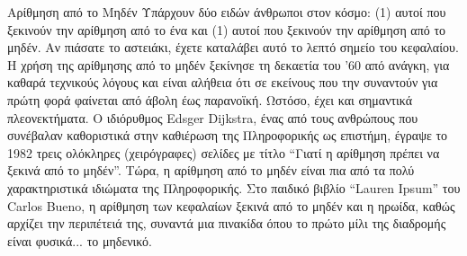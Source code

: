 \documentclass[a4paper,11pt,oneside]{book}
\begin{document}
\begin{theory}{Αρίθμηση από το Μηδέν}
Υπάρχουν δύο ειδών άνθρωποι στον κόσμο: (1) αυτοί που ξεκινούν την αρίθμηση από το ένα και (1) αυτοί που ξεκινούν την αρίθμηση από το μηδέν. Αν πιάσατε το αστειάκι, έχετε καταλάβει αυτό το λεπτό σημείο του κεφαλαίου. Η χρήση της αρίθμησης από το μηδέν ξεκίνησε τη δεκαετία του '60 από ανάγκη, για καθαρά τεχνικούς λόγους και είναι αλήθεια ότι σε εκείνους που την συναντούν για πρώτη φορά φαίνεται από άβολη έως παρανοϊκή. Ωστόσο, έχει και σημαντικά πλεονεκτήματα. Ο ιδιόρυθμος Edsger Dijkstra, ένας από τους ανθρώπους που συνέβαλαν καθοριστικά στην καθιέρωση της Πληροφορικής ως επιστήμη, έγραψε το 1982 τρεις ολόκληρες (χειρόγραφες) σελίδες με τίτλο ``Γιατί η αρίθμηση πρέπει να ξεκινά από το μηδέν''. Τώρα, η αρίθμηση από το μηδέν είναι πια από τα πολύ χαρακτηριστικά ιδιώματα της Πληροφορικής. Στο παιδικό βιβλίο ``Lauren Ipsum'' του Carlos Bueno, η αρίθμηση των κεφαλαίων ξεκινά από το μηδέν και η ηρωίδα, καθώς αρχίζει την περιπέτειά της, συναντά μια πινακίδα όπου το πρώτο μίλι της διαδρομής είναι φυσικά... το μηδενικό.
\end{theory}



\hrulefill

\end{document}

